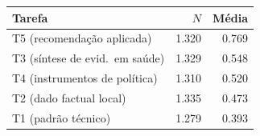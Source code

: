 \begin{tabular}{lrr}
\toprule
Tarefa & $N$ & Média \\
\midrule
T5 (recomendação aplicada)     & 1.320 & 0.769 \\
T3 (síntese de evid.\ em saúde) & 1.329 & 0.548 \\
T4 (instrumentos de política)  & 1.310 & 0.520 \\
T2 (dado factual local)        & 1.335 & 0.473 \\
T1 (padrão técnico)            & 1.279 & 0.393 \\
\bottomrule
\end{tabular}
